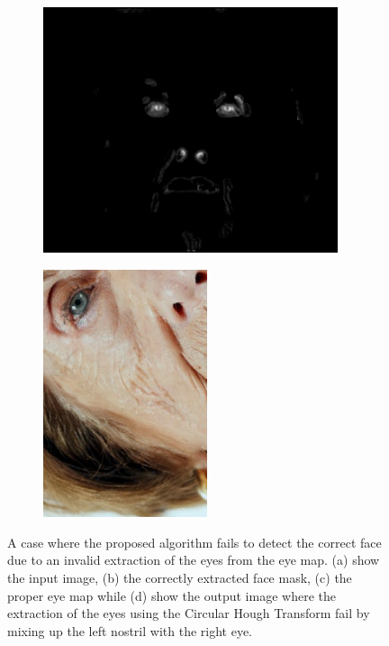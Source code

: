 \begin{figure}[H]
\begin{subfigure}{.25\textwidth}
  \includegraphics[width=0.95\textwidth]{img/fd3/fail1_finalEyeMap.png}
  \caption{}
\end{subfigure}%
\begin{subfigure}{.25\textwidth}
  \centering
  \includegraphics[width=0.53\textwidth]{img/fd3/fail1_output.png}
  \caption{}
\end{subfigure}%

\caption{A case where the proposed algorithm fails to detect the correct face due to an invalid extraction of the eyes from the eye map. (a) show the input image, (b) the correctly extracted face mask, (c) the proper eye map while (d) show the output image where the extraction of the eyes using the Circular Hough Transform fail by mixing up the left nostril with the right eye. }
\label{fig:fail1}
\end{figure}







